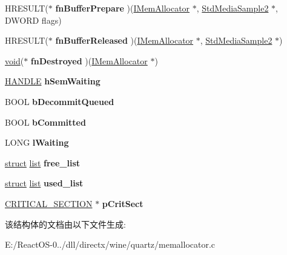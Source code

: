 \begin{DoxyCompactItemize}
H\+R\+E\+S\+U\+LT($\ast$ {\bfseries fn\+Buffer\+Prepare} )(\hyperlink{interface_i_mem_allocator}{I\+Mem\+Allocator} $\ast$, \hyperlink{struct_std_media_sample2}{Std\+Media\+Sample2} $\ast$, D\+W\+O\+RD flags)
\item 
\mbox{\label{struct_base_mem_allocator_a720fc60feb2733949e95aae14e52117b}} 
H\+R\+E\+S\+U\+LT($\ast$ {\bfseries fn\+Buffer\+Released} )(\hyperlink{interface_i_mem_allocator}{I\+Mem\+Allocator} $\ast$, \hyperlink{struct_std_media_sample2}{Std\+Media\+Sample2} $\ast$)
\item 
\mbox{\label{struct_base_mem_allocator_afcfcc78d0c81d58fdaf4808fe7fb25ad}} 
\hyperlink{interfacevoid}{void}($\ast$ {\bfseries fn\+Destroyed} )(\hyperlink{interface_i_mem_allocator}{I\+Mem\+Allocator} $\ast$)
\item 
\mbox{\label{struct_base_mem_allocator_a9161f1100259e20a6bd3fb80f7a26601}} 
\hyperlink{interfacevoid}{H\+A\+N\+D\+LE} {\bfseries h\+Sem\+Waiting}
\item 
\mbox{\label{struct_base_mem_allocator_a162d39cb6add0c48a2754b5c97cee8fb}} 
B\+O\+OL {\bfseries b\+Decommit\+Queued}
\item 
\mbox{\label{struct_base_mem_allocator_a59d863dae77ab30ef165dc068302effe}} 
B\+O\+OL {\bfseries b\+Committed}
\item 
\mbox{\label{struct_base_mem_allocator_ac80e4efd58a878bb8defdf772f33a851}} 
L\+O\+NG {\bfseries l\+Waiting}
\item 
\mbox{\label{struct_base_mem_allocator_a7b1e030a84141977ff34d6a3071964b1}} 
\hyperlink{interfacestruct}{struct} \hyperlink{classlist}{list} {\bfseries free\+\_\+list}
\item 
\mbox{\label{struct_base_mem_allocator_a610453ef03453b55c2493ae5f81f8fb8}} 
\hyperlink{interfacestruct}{struct} \hyperlink{classlist}{list} {\bfseries used\+\_\+list}
\item 
\mbox{\label{struct_base_mem_allocator_a8492323927550bd77238ab2839e8428e}} 
\hyperlink{struct___c_r_i_t_i_c_a_l___s_e_c_t_i_o_n}{C\+R\+I\+T\+I\+C\+A\+L\+\_\+\+S\+E\+C\+T\+I\+ON} $\ast$ {\bfseries p\+Crit\+Sect}
\end{DoxyCompactItemize}


该结构体的文档由以下文件生成\+:\begin{DoxyCompactItemize}
\item 
E\+:/\+React\+O\+S-\/0../dll/directx/wine/quartz/memallocator.\+c\end{DoxyCompactItemize}

